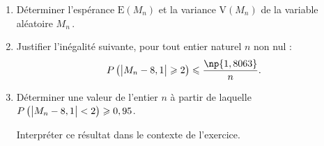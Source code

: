 	\begin{enumerate}
		\item Déterminer l'espérance $\mathrm{E}\left(M_{n}\right)$ et la variance $\mathrm{V}\left(M_{n}\right)$ de la variable aléatoire $M_{n}$\,.
		
		\item Justifier l'inégalité suivante, pour tout entier naturel $n$ non nul :
		\[P\left(\left|\strut M_{n}-8,1\right| \geqslant  2\right) \leqslant  \dfrac{\np{1,8063}}{n}.\]
		
		\item Déterminer une valeur de l'entier $n$ à partir de laquelle \quad $P\left(\left|\strut M_{n}-8,1\right|<2\right) \geqslant  0,95$.
		
		Interpréter ce résultat dans le contexte de l'exercice.
	\end{enumerate}
